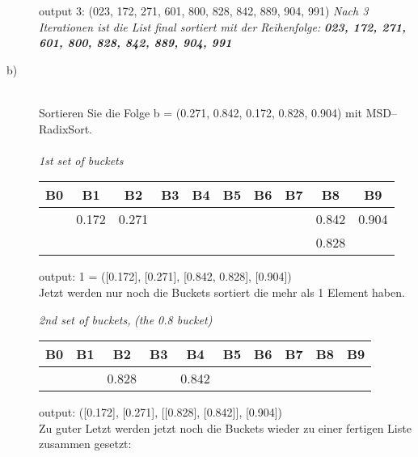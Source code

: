 \documentclass[12pt, a4paper, twoside]{article}
\begin{document}
\begin{description}
\begin{tabular}{| c| c| c| c| c| c| c| c| c| c|}
		\hline
	\end{tabular}
	
	output 3: (023, 172, 271, 601, 800, 828, 842, 889, 904, 991)
	\newline
	\emph{Nach 3 Iterationen ist die List final sortiert mit der Reihenfolge:}
	\newline
	\textbf{\emph{023, 172, 271, 601, 800, 828, 842, 889, 904, 991}}
	\newline
	
	\pagebreak
	
	\item[b)] \hfill \\
	Sortieren Sie die Folge b = (0.271, 0.842, 0.172, 0.828, 0.904) mit MSD–RadixSort.
	\\ \\
	
	\emph{1st set of buckets}\\
	\begin{tabular}{| c| c| c| c| c| c| c| c| c| c|}
		
		\hline
		B0 & B1 & B2 & B3 & B4 & B5 & B6 & B7 & B8 & B9 \\
		\hline\hline
		
		& 0.172 & 0.271 & & & & & & 0.842 & 0.904 \\
		&       &       & & & & & & 0.828 &  \\
		
		\hline
	\end{tabular}

	output: 1 = ([0.172], [0.271], [0.842, 0.828], [0.904]) \\
	
	Jetzt werden nur noch die Buckets sortiert die mehr als 1 Element haben.
	
	\emph{2nd set of buckets, }
	\emph{(the 0.8 bucket)}\\
	\begin{tabular}{| c| c| c| c| c| c| c| c| c| c|}
		
		\hline
		B0 & B1 & B2 & B3 & B4 & B5 & B6 & B7 & B8 & B9 \\
		\hline\hline
		
		& & 0.828 & & 0.842 & & & & & \\
		
		\hline
	\end{tabular}
	
	output: ([0.172], [0.271], [[0.828], [0.842]], [0.904]) \\
	
	Zu guter Letzt werden jetzt noch die Buckets wieder zu einer fertigen Liste zusammen gesetzt:
	

\end{description}
\end{document}

